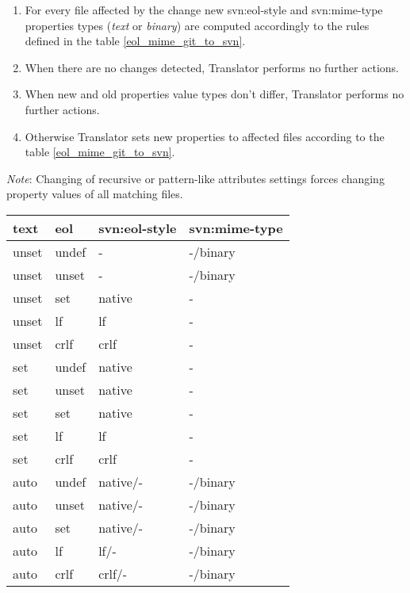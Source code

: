 \begin{enumerate}
\compactlist
\item For every file affected by the change new svn:eol-style and svn:mime-type properties types (\emph{text} or \emph{binary}) are computed accordingly to the rules defined in the table \ref{eol_mime_git_to_svn}.
\item When there are no changes detected, Translator performs no further actions.
\item When new and old properties value types don't differ, Translator performs no further actions.
\item Otherwise Translator sets new properties to affected files according to the table \ref{eol_mime_git_to_svn}.
\end{enumerate}

\emph{Note}: Changing of recursive or pattern-like attributes settings forces changing property values of all matching files.

\begin{center}
\begin{tabular}{| p{} | p{} | p{} | p{} |}
	\hline
	text  & eol      &  svn:eol-style  &  svn:mime-type \\ \hline \hline
	unset & undef    &  -              &  -/binary \footnotemark[1] \\ \hline
	unset & unset    &  -              &  -/binary \\ \hline
	unset & set      &  native         &  - \footnotemark[2] \\ \hline
	unset & lf       &  lf             &  - \\ \hline
	unset & crlf     &  crlf           &  - \\ \hline
	set   & undef    &  native         &  - \\ \hline
	set   & unset    &  native         &  - \\ \hline
	set   & set      &  native         &  - \\ \hline
	set   & lf       &  lf             &  - \\ \hline
	set   & crlf     &  crlf           &  - \\ \hline
	auto  & undef    &  native/-       &  -/binary \\ \hline
	auto  & unset    &  native/-       &  -/binary \\ \hline
	auto  & set      &  native/-       &  -/binary \\ \hline
	auto  & lf       &  lf/-           &  -/binary \\ \hline
	auto  & crlf     &  crlf/-         &  -/binary \\ \hline
\end{tabular}
\label{eol_mime_git_to_svn}
\end{center}
